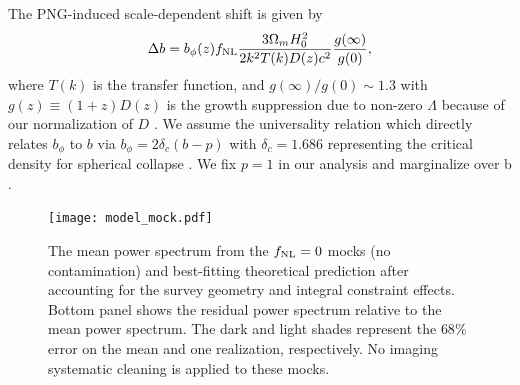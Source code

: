 
The PNG-induced scale-dependent shift is given by \citep{slosar2008constraints}
\begin{equation}
\Delta b = b_{\phi}(z) f_{\rm NL} \frac{3 \Omega_{m} H^{2}_{0}}{2 k^{2}T(k)D(z) c^{2}} \frac{g(\infty)}{g(0)},
\label{eq:scaledepbias}
\end{equation}
where $T(k)$ is the transfer function, and $g(\infty)/g(0) \sim 1.3$ with $g(z)\equiv (1+z) D(z)$ is the growth suppression due to non-zero $\Lambda$ because of our normalization of $D$ \citep[see, e.g.,][]{2010JCAP...07..013R, 2019MNRAS.485.4160M}. We assume the universality relation which directly relates $b_\phi$ to $b$ via $b_{\phi} = 2 \delta_{c}(b - p)$ with $\delta_{c}= 1.686$ representing the critical density for spherical collapse \citep{fillmore1984self}. We fix $p=1$ in our analysis and marginalize over b \citep[see, also,][]{slosar2008constraints,2010JCAP...07..013R,2013MNRAS.428.1116R}. 

\begin{figure}
\centering
\texttt{[image: model\_mock.pdf]}
\caption{The mean power spectrum from the $f_{\rm NL}=0$ mocks (no contamination) and best-fitting theoretical prediction after accounting for the survey geometry and integral constraint effects. Bottom panel shows the residual power spectrum relative to the mean power spectrum. The dark and light shades represent the $68\%$ error on the mean and one realization, respectively. No imaging systematic cleaning is applied to these mocks.}\label{fig:model_mock}
\end{figure}


